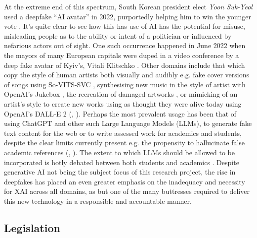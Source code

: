 At the extreme end of this spectrum, South Korean president elect \emph{Yoon Suk-Yeol} used a deepfake “AI avatar” in 2022, purportedly helping him to win the younger vote \cite{SouthKoreaPresidential2022}. It’s quite clear to see how this has use of AI has the potential for misuse, misleading people as to the ability or intent of a politician or influenced by nefarious actors out of sight. One such occurrence happened in June 2022 when the mayors of many European capitals were duped in a video conference by a deep fake avatar of Kyiv’s, Vitali Klitschko \cite{pashentsevPalgraveHandbookMalicious2023}. Other domains include that which copy the style of human artists both visually and audibly e.g. fake cover versions of songs using So-VITS-SVC \cite{SoftVCVITSSinging2023}, synthesising new music in the style of artist with OpenAI’s Jukebox \cite{openaiJukebox2023}, the recreation of damaged artworks \cite{googleKlimtVsKlimt2021}, or mimicking of an artist’s style to create new works using as thought they were alive today using OpenAI’s DALL-E 2 (\cite{DALL}, \cite{evansClimateCrisisPaintings2022}). Perhaps the most prevalent usage has been that of using ChatGPT \cite{ChatGPT} and other such Large Language Models (LLMs), to generate fake text content for the web or to write assessed work for academics and students, despite the clear limits currently present e.g. the propensity to hallucinate false academic references (\cite{alkaissiArtificialHallucinationsChatGPT2023}, \cite{waltersFabricationErrorsBibliographic2023}). The extent to which LLMs should be allowed to be incorporated is hotly debated between both students and academics \cite{attewellExploringRoleGenerative2023}. Despite generative AI not being the subject focus of this research project, the rise in deepfakes has placed an even greater emphasis on the inadequacy and necessity for XAI across all domains, as but one of the many buttresses required to deliver this new technology in a responsible and accountable manner.

\subsection{Legislation}

